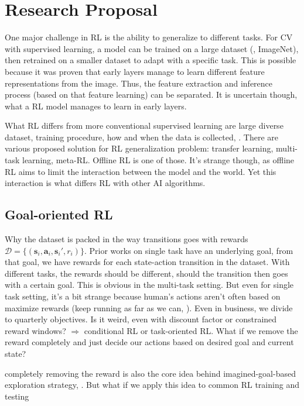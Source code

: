 \chapter{Research Proposal}

One major challenge in \ac{RL} is the ability to generalize to different tasks. For \ac{CV} with supervised learning, a model can be trained on a large dataset (\eg, ImageNet), then retrained on a smaller dataset to adapt with a specific task. This is possible because it was proven that early layers manage to learn different feature representations from the image. Thus, the feature extraction and inference process (based on that feature learning) can be separated. It is uncertain though, what a \ac{RL} model manages to learn in early layers.

What \ac{RL} differs from more conventional supervised learning are large diverse dataset, training procedure, how and when the data is collected, \etc. There are various proposed solution for \ac{RL} generalization problem: transfer learning, multi-task learning, meta-\ac{RL}. Offline \ac{RL} is one of those. It's strange though, as offline \ac{RL} aims to limit the interaction between the model and the world. Yet this interaction is what differs \ac{RL} with other \ac{AI} algorithms.

\section{Goal-oriented \ac{RL}}
Why the dataset is packed in the way transitions goes with rewards $\mathcal{D} = \{ (\textbf{s}_i, \textbf{a}_i, \textbf{s}_i', r_i) \}$. Prior works on single task have an underlying goal, from that goal, we have rewards for each state-action transition in the dataset. With different tasks, the rewards should be different, should the transition then goes with a certain goal. This is obvious in the multi-task setting. But even for single task setting, it's a bit strange because human's actions aren't often based on maximize rewards (keep running as far as we can, \etc). Even in business, we divide to quarterly objectives. Is it weird, even with discount factor or constrained reward windows? $\Rightarrow$ conditional \ac{RL} or task-oriented \ac{RL}. What if we remove the reward completely and just decide our actions based on desired goal and current state?

completely removing the reward is also the core idea behind imagined-goal-based exploration strategy, \etc. But what if we apply this idea to common \ac{RL} training and testing

